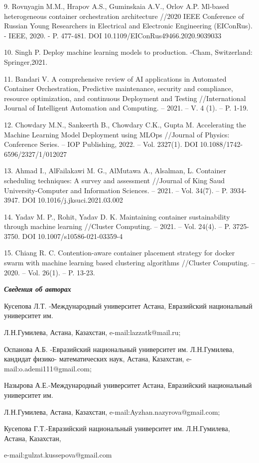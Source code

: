 \begin{noparindent}
9.
Rovnyagin M.M., Hrapov A.S., Guminskaia A.V., Orlov A.P. Ml-based
heterogeneous container orchestration architecture //2020 IEEE
Conference of Russian Young Researchers in Electrical and Electronic
Engineering (EIConRus). - IEEE, 2020. - P. 477-481. DOI
10.1109/EIConRus49466.2020.9039033

10.
Singh P. Deploy machine learning models to production. -Cham,
Switzerland: Springer,2021.

11.
Bandari V. A comprehensive review of AI applications in Automated
Container Orchestration, Predictive maintenance, security and
compliance, resource optimization, and continuous Deployment and
Testing //International Journal of Intelligent Automation and
Computing. -- 2021. -- V. 4 (1). -- P. 1-19.

12.
Chowdary M.N., Sankeerth B., Chowdary C.K., Gupta M. Accelerating the
Machine Learning Model Deployment using MLOps //Journal of Physics:
Conference Series. -- IOP Publishing, 2022. -- Vol. 2327(1). DOI
10.1088/1742-6596/2327/1/012027

13.
Ahmad I., AlFailakawi M. G., AlMutawa A., Alsalman, L. Container
scheduling techniques: A survey and assessment //Journal of King Saud
University-Computer and Information Sciences. -- 2021. -- Vol. 34(7).
-- P. 3934-3947. DOI 10.1016/j.jksuci.2021.03.002

14.
Yadav M. P., Rohit, Yadav D. K. Maintaining container sustainability
through machine learning //Cluster Computing. -- 2021. -- Vol. 24(4).
-- P. 3725-3750. DOI 10.1007/s10586-021-03359-4

15.
Chiang R. C. Contention-aware container placement strategy for docker
swarm with machine learning based clustering algorithms //Cluster
Computing. -- 2020. -- Vol. 26(1). -- P. 13-23.
\end{noparindent}

\emph{{\bfseries Сведения об авторах}}

\begin{noparindent}
Кусепова Л.Т. -Международный университет Астана, Евразийский
национальный университет им.

Л.Н.Гумилева, Астана, Казахстан,
e-mail:lazzatk@mail.ru;

Оспанова А.Б. -Евразийский национальный университет им. Л.Н.Гумилева,
кандидат физико- математических наук, Астана, Казахстан,
e-mail:o.ademi111@gmail.com;

Назырова А.Е.-Международный университет Астана, Евразийский национальный
университет им.

Л.Н.Гумилева, Астана, Казахстан,
e-mail:Ayzhan.nazyrova@gmail.com;

Кусепова Г.Т.-Евразийский национальный университет им. Л.Н.Гумилева,
Астана, Казахстан,

e-mail:gulzat.kussepova@gmail.com
\end{noparindent}

